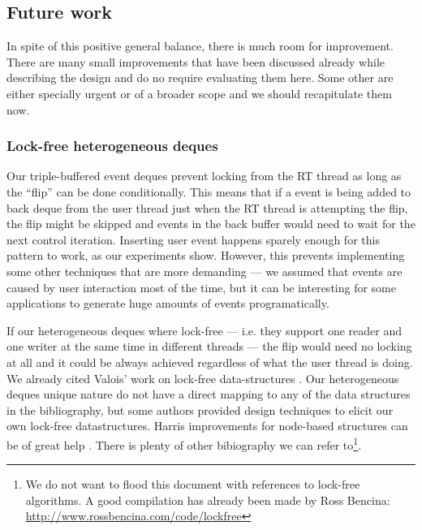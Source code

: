 \subsection{Future work}

In spite of this positive general balance, there is much room for
improvement. There are many small improvements that have been
discussed already while describing the design and do no require
evaluating them here. Some other are either specially urgent or of a
broader scope and we should recapitulate them now.

\subsubsection{Lock-free heterogeneous deques}
\label{sec:improvehetero}

Our triple-buffered event deques
prevent locking from the RT thread as long as the ``flip'' can be done
conditionally. This means that if a event is being added to back deque
from the user thread just when the RT thread is attempting the flip,
the flip might be skipped and events in the back buffer would need to
wait for the next control iteration. Inserting user event happens
sparely enough for this pattern to work, as our experiments
show. However, this prevents implementing some other techniques that
are more demanding --- we assumed that events are caused by user
interaction most of the time, but it can be interesting for some
applications to generate huge amounts of events programatically.

If our
heterogeneous deques where lock-free --- i.e. they support one reader
and one writer at the same time in different threads --- the flip
would need no locking at all and it could be always achieved
regardless of what the user thread is doing. We already cited Valois'
work on lock-free data-structures \cite{valois96lockfree,
  michael95correction}. Our heterogeneous deques unique nature do not
have a direct mapping to any of the data structures in the
bibliography, but some authors provided design techniques to elicit
our own lock-free datastructures. Harris improvements for node-based
structures can be of great help \cite{harris01pragmatic}. There is
plenty of other bibiography we can refer to\footnote{We do not want to
  flood this document with references to lock-free algorithms. A good
  compilation has already been made by Ross Bencina:
  \url{http://www.rossbencina.com/code/lockfree}}.

